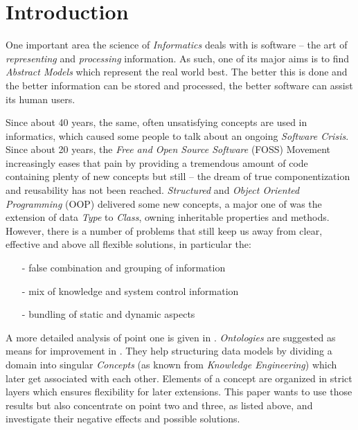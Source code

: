%
%
%
%
%
%
%

\section{Introduction}
\label{introduction_heading}

One important area the science of \emph{Informatics} deals with is software --
the art of \emph{representing} and \emph{processing} information. As such, one of
its major aims is to find \emph{Abstract Models} which represent the real world
best. The better this is done and the better information can be stored and
processed, the better software can assist its human users.

Since about 40 years, the same, often unsatisfying concepts are used in informatics,
which caused some people to talk about an ongoing \emph{Software Crisis}.
Since about 20 years, the \emph{Free and Open Source Software} (FOSS) Movement
increasingly eases that pain by providing a tremendous amount of code containing
plenty of new concepts but still -- the dream of true componentization and
reusability has not been reached.
\emph{Structured} and \emph{Object Oriented Programming} (OOP) delivered some new
concepts, a major one of was the extension of data \emph{Type} to \emph{Class},
owning inheritable properties and methods. However, there is a number of problems
that still keep us away from clear, effective and above all flexible solutions,
in particular the:

\begin{itemize}
    \item[-]{false combination and grouping of information}
    \item[-]{mix of knowledge and system control information}
    \item[-]{bundling of static and dynamic aspects}
\end{itemize}

A more detailed analysis of point one is given in \cite{hellerbohl}.
\emph{Ontologies} are suggested as means for improvement in \cite{hellerkunze}.
They help structuring data models by dividing a domain into singular \emph{Concepts}
(as known from \emph{Knowledge Engineering}) which later get associated with each
other. Elements of a concept are organized in strict layers which ensures
flexibility for later extensions. This paper wants to use those results but also
concentrate on point two and three, as listed above, and investigate their
negative effects and possible solutions.


